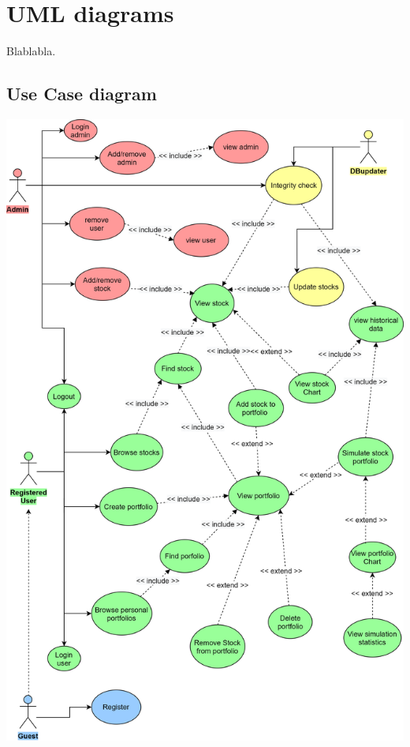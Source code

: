 \chapter{UML diagrams}
Blablabla.

\section{Use Case diagram}

\includegraphics[scale=0.2]{img/use_case.png}\\

